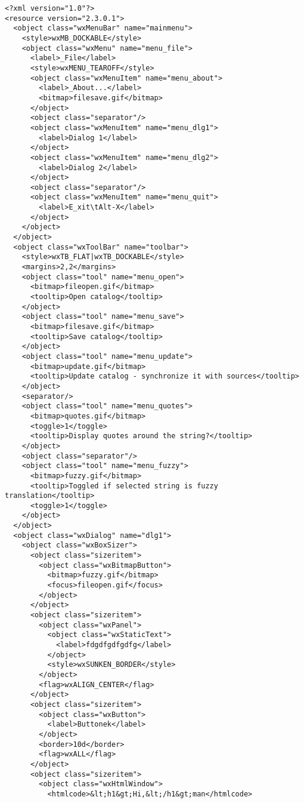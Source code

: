 \begin{verbatim}
<?xml version="1.0"?>
<resource version="2.3.0.1">
  <object class="wxMenuBar" name="mainmenu">
    <style>wxMB_DOCKABLE</style>
    <object class="wxMenu" name="menu_file">
      <label>_File</label>
      <style>wxMENU_TEAROFF</style>
      <object class="wxMenuItem" name="menu_about">
        <label>_About...</label>
        <bitmap>filesave.gif</bitmap>
      </object>
      <object class="separator"/>
      <object class="wxMenuItem" name="menu_dlg1">
        <label>Dialog 1</label>
      </object>
      <object class="wxMenuItem" name="menu_dlg2">
        <label>Dialog 2</label>
      </object>
      <object class="separator"/>
      <object class="wxMenuItem" name="menu_quit">
        <label>E_xit\tAlt-X</label>
      </object>
    </object>
  </object>
  <object class="wxToolBar" name="toolbar">
    <style>wxTB_FLAT|wxTB_DOCKABLE</style>
    <margins>2,2</margins>
    <object class="tool" name="menu_open">
      <bitmap>fileopen.gif</bitmap>
      <tooltip>Open catalog</tooltip>
    </object>
    <object class="tool" name="menu_save">
      <bitmap>filesave.gif</bitmap>
      <tooltip>Save catalog</tooltip>
    </object>
    <object class="tool" name="menu_update">
      <bitmap>update.gif</bitmap>
      <tooltip>Update catalog - synchronize it with sources</tooltip>
    </object>
    <separator/>
    <object class="tool" name="menu_quotes">
      <bitmap>quotes.gif</bitmap>
      <toggle>1</toggle>
      <tooltip>Display quotes around the string?</tooltip>
    </object>
    <object class="separator"/>
    <object class="tool" name="menu_fuzzy">
      <bitmap>fuzzy.gif</bitmap>
      <tooltip>Toggled if selected string is fuzzy translation</tooltip>
      <toggle>1</toggle>
    </object>
  </object>
  <object class="wxDialog" name="dlg1">
    <object class="wxBoxSizer">
      <object class="sizeritem">
        <object class="wxBitmapButton">
          <bitmap>fuzzy.gif</bitmap>
          <focus>fileopen.gif</focus>
        </object>
      </object>
      <object class="sizeritem">
        <object class="wxPanel">
          <object class="wxStaticText">
            <label>fdgdfgdfgdfg</label>
          </object>
          <style>wxSUNKEN_BORDER</style>
        </object>
        <flag>wxALIGN_CENTER</flag>
      </object>
      <object class="sizeritem">
        <object class="wxButton">
          <label>Buttonek</label>
        </object>
        <border>10d</border>
        <flag>wxALL</flag>
      </object>
      <object class="sizeritem">
        <object class="wxHtmlWindow">
          <htmlcode>&lt;h1&gt;Hi,&lt;/h1&gt;man</htmlcode>

\end{verbatim}
